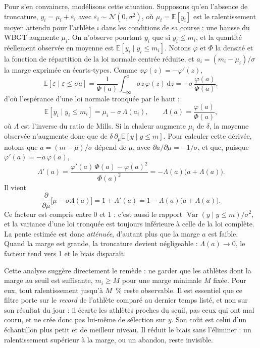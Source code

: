 \documentclass[11pt,a4paper]{article}
\newcommand{\E}{\mathbb{E}}
\DeclareMathOperator{\Var}{Var}
\newcommand{\dd}{\mathrm{d}}
\begin{document}
Pour s'en convaincre, modélisons cette situation. Supposons qu'en l'absence de troncature,
$y_i = \mu_i + \varepsilon_i$ avec $\varepsilon_i \sim \mathcal{N}(0, \sigma^2)$, où $\mu_i = \E[y_i]$ est le
ralentissement moyen attendu pour l'athlète $i$ dans les conditions de sa course ; une hausse du WBGT augmente
$\mu_i$. On n'observe pourtant $y_i$ que si $y_i \leq m_i$, et la quantité réellement observée en moyenne est
$\E[y_i \mid y_i \leq m_i]$. Notons $\varphi$ et $\Phi$ la densité et la fonction de répartition de la loi normale
centrée réduite, et $a_i = (m_i - \mu_i)/\sigma$ la marge exprimée en écarts-types. Comme $z\varphi(z) =
-\varphi'(z)$,
\[
\E[\varepsilon \mid \varepsilon \leq \sigma a] = \frac{1}{\Phi(a)}\int_{-\infty}^a \sigma z\,\varphi(z)\,\dd z
= -\sigma\,\frac{\varphi(a)}{\Phi(a)},
\]
d'où l'espérance d'une loi normale tronquée par le haut :
\begin{equation}\label{eq:troncature}
\E[y_i \mid y_i \leq m_i] = \mu_i - \sigma\,\Lambda(a_i), \qquad \Lambda(a) = \frac{\varphi(a)}{\Phi(a)},
\end{equation}
où $\Lambda$ est l'inverse du ratio de Mills. Si la chaleur augmente $\mu_i$ de $\delta$, la moyenne observée
n'augmente donc que de $\delta\,\partial_\mu \E[y \mid y \leq m]$. Pour calculer cette dérivée, notons que
$a = (m - \mu)/\sigma$ dépend de $\mu$, avec $\partial a/\partial \mu = -1/\sigma$, et que, puisque
$\varphi'(a) = -a\,\varphi(a)$,
\[
\Lambda'(a) = \frac{\varphi'(a)\,\Phi(a) - \varphi(a)^2}{\Phi(a)^2} = -\Lambda(a)\big(a + \Lambda(a)\big).
\]
Il vient
\begin{equation}\label{eq:attenuation}
\frac{\partial}{\partial \mu}\big[\mu - \sigma\Lambda(a)\big] = 1 + \Lambda'(a) = 1 - \Lambda(a)\big(a + \Lambda(a)\big).
\end{equation}
Ce facteur est compris entre 0 et 1 : c'est aussi le rapport $\Var(y \mid y \leq m)/\sigma^2$, et la variance d'une
loi tronquée est toujours inférieure à celle de la loi complète. La pente estimée est donc \emph{atténuée}, d'autant
plus que la marge $a$ est faible. Quand la marge est grande, la troncature devient négligeable : $\Lambda(a) \to 0$,
le facteur tend vers 1 et le biais disparaît.

Cette analyse suggère directement le remède : ne garder que les athlètes dont la marge au seuil est suffisante,
$m_i \geq M$ pour une marge minimale $M$ fixée. Pour eux, tout ralentissement jusqu'à $M$~\% reste observable. Il est
essentiel que ce filtre porte sur le \emph{record} de l'athlète comparé au dernier temps listé, et non sur son
résultat du jour : il écarte les athlètes proches du seuil, pas ceux qui ont mal couru, et ne crée donc pas lui-même
de sélection sur $y$. Son coût est celui d'un échantillon plus petit et de meilleur niveau. Il réduit le biais sans
l'éliminer : un ralentissement supérieur à la marge, ou un abandon, reste invisible.
\end{document}
